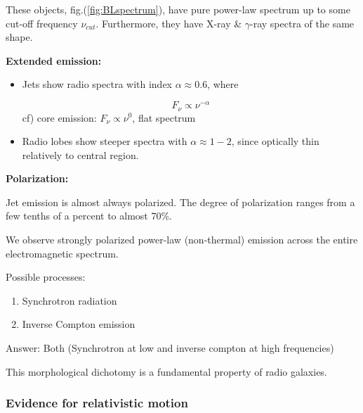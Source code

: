 \begin{enumerate}[a)]
These objects, fig.(\ref{fig:BLspectrum}), have pure power-law spectrum up to some cut-off frequency $\nu_{cut}$.
Furthermore, they have X-ray \& $\gamma$-ray spectra of the same shape.

\textbf{Extended emission:}
   \begin{itemize}
      \item Jets show radio spectra with index $\alpha \approx 0.6$, where

\begin{equation}
   F_{\nu} \propto \nu^{-\alpha}
\end{equation}
   cf) core emission: $F_{\nu} \propto \nu^{0}$, \ie flat spectrum

      \item Radio lobes show steeper spectra with $\alpha \approx 1-2$, since optically thin relatively to central region.
   \end{itemize}

\textbf{Polarization:}

Jet emission is almost always polarized. The degree of polarization ranges from a few tenths of a percent to almost 70\%.

We observe strongly polarized power-law (non-thermal) emission across the entire electromagnetic spectrum.

Possible processes:

   \begin{enumerate}[1)]
      \item Synchrotron radiation
      \item Inverse Compton emission
   \end{enumerate}

Answer: Both (Synchrotron at low and inverse compton at high frequencies)

This morphological dichotomy is a fundamental property of radio galaxies.

\end{enumerate}

\subsubsection{Evidence for relativistic motion}

